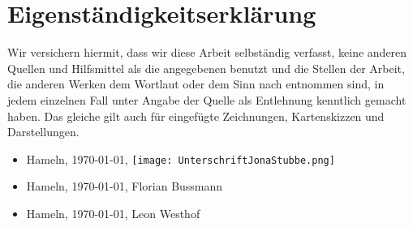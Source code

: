\documentclass[a4paper,12pt,titlepage]{article}
\begin{document}
\part{Eigenständigkeitserklärung}
Wir versichern hiermit, dass wir diese Arbeit selbständig verfasst, keine anderen Quellen und Hilfsmittel
als die angegebenen benutzt und die Stellen der Arbeit, die anderen Werken dem Wortlaut oder dem Sinn nach entnommen sind,
in jedem einzelnen Fall unter Angabe der Quelle als Entlehnung kenntlich gemacht haben.
Das gleiche gilt auch für eingefügte Zeichnungen, Kartenskizzen und Darstellungen.
\begin{itemize}
\item Hameln, \today, \texttt{[image: UnterschriftJonaStubbe.png]}
\item Hameln, \today, Florian Bussmann	
\item Hameln, \today, Leon Westhof
\end{itemize}
\end{document}
